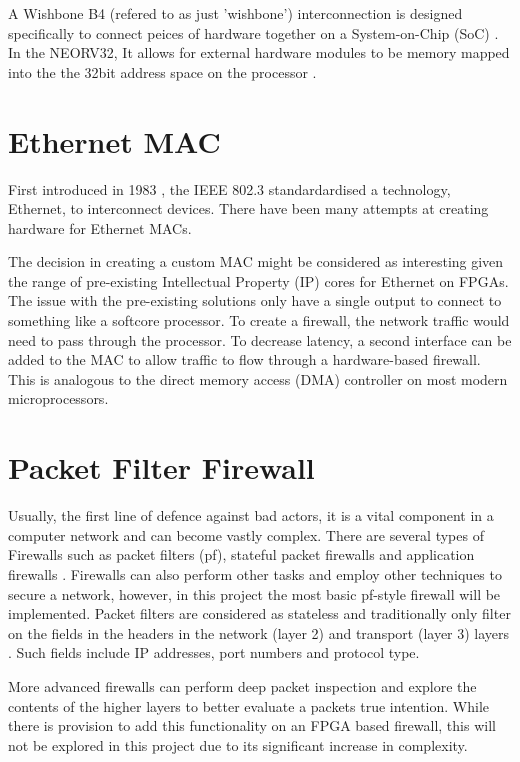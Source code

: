 A Wishbone B4 (refered to as just 'wishbone') interconnection is designed specifically to connect peices of hardware together on a System-on-Chip (SoC) \cite{WishboneSpec}. In the NEORV32, 
It allows for external hardware modules to be memory mapped into the the 32bit address space on the processor \cite{neorv32Datasheet}.




\section{Ethernet MAC}

First introduced in 1983 \cite{IEEE802.3-2012}, the IEEE 802.3 standardardised a technology, Ethernet, to interconnect devices. There have been 
many attempts at creating hardware for Ethernet MACs. 





The decision in creating a custom MAC might be considered as interesting given the range of pre-existing Intellectual 
Property (IP) cores for Ethernet on FPGAs. The issue with the pre-existing solutions only have a single output to connect to something like a softcore
processor. To create a firewall, the network traffic would need to pass through the processor. To decrease latency, a second interface can be added 
to the MAC to allow traffic to flow through a hardware-based firewall. This is analogous to the direct memory access (DMA) controller on most modern 
microprocessors. 



\section{Packet Filter Firewall}

Usually, the first line of defence against bad actors, it is a vital component in a computer network and can become vastly complex. There are several
types of Firewalls such as packet filters (pf), stateful packet firewalls and application firewalls \cite{FirewallsBook}. Firewalls can also perform 
other tasks and employ other techniques to secure a network, however, in this project the most basic pf-style firewall will be implemented. 
Packet filters are considered as stateless and traditionally only filter on the fields in the headers in the network (layer 2) and transport 
(layer 3) layers \cite{FirewallsBook}. Such fields include IP addresses, port numbers and protocol type.

More advanced firewalls can perform deep packet inspection and explore the contents of the higher layers to better evaluate a packets true intention. 
While there is provision to add this functionality on an FPGA based firewall, this will not be explored in this project due to its significant increase 
in complexity. 



